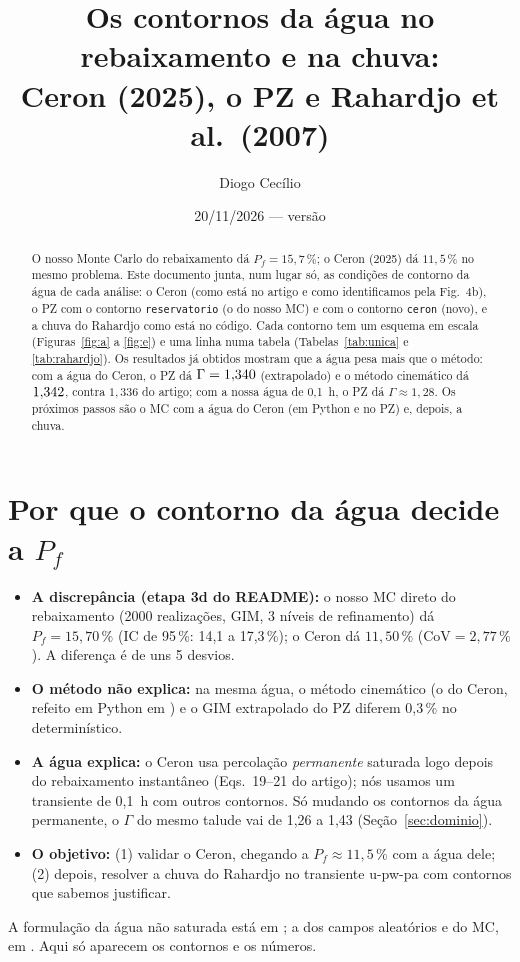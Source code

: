 \documentclass[11pt,a4paper]{article}
\title{Os contornos da água no rebaixamento e na chuva:\\ Ceron (2025), o PZ e Rahardjo et al.\ (2007)}
\author{Diogo Cecílio}
\date{20/11/2026 --- versão \versao}
\begin{document}
\maketitle
\begin{abstract}
O nosso Monte Carlo do rebaixamento dá $P_f = 15{,}7\,\%$; o Ceron (2025) dá $11{,}5\,\%$ no mesmo problema. Este
documento junta, num lugar só, as condições de contorno da água de cada análise: o Ceron (como está no artigo e como
identificamos pela Fig.~4b), o PZ com o contorno \texttt{reservatorio} (o do nosso MC) e com o contorno
\texttt{ceron} (novo), e a chuva do Rahardjo como está no código. Cada contorno tem um esquema em escala
(Figuras~\ref{fig:a} a \ref{fig:e}) e uma linha numa tabela (Tabelas~\ref{tab:unica} e \ref{tab:rahardjo}). Os
resultados já obtidos mostram que a água pesa mais que o método: com a água do Ceron, o PZ dá
$\Gamma = 1{,}340$ (extrapolado) e o método cinemático dá $1{,}342$, contra $1{,}336$ do artigo; com a nossa água de
0,1~h, o PZ dá $\Gamma \approx 1{,}28$. Os próximos passos são o MC com a água do Ceron (em Python e no PZ) e, depois,
a chuva.
\end{abstract}
\tableofcontents

\section{Por que o contorno da água decide a $P_f$}
\begin{itemize}
  \item \textbf{A discrepância (etapa 3d do README):} o nosso MC direto do rebaixamento (2000 realizações, GIM, 3 níveis
    de refinamento) dá $P_f = 15{,}70\,\%$ (IC de 95\,\%: 14,1 a 17,3\,\%); o Ceron dá $11{,}50\,\%$
    ($\mathrm{CoV} = 2{,}77\,\%$). A diferença é de uns 5 desvios.
  \item \textbf{O método não explica:} na mesma água, o método cinemático (o do Ceron, refeito em Python em
    ) e o GIM extrapolado do PZ diferem 0,3\,\% no determinístico.
  \item \textbf{A água explica:} o Ceron usa percolação \emph{permanente} saturada logo depois do rebaixamento
    instantâneo (Eqs.~19--21 do artigo); nós usamos um transiente de 0,1~h com outros contornos. Só mudando os
    contornos da água permanente, o $\Gamma$ do mesmo talude vai de 1,26 a 1,43 (Seção~\ref{sec:dominio}).
  \item \textbf{O objetivo:} (1) validar o Ceron, chegando a $P_f \approx 11{,}5\,\%$ com a água dele; (2) depois,
    resolver a chuva do Rahardjo no transiente u-pw-pa com contornos que sabemos justificar.
\end{itemize}
A formulação da água não saturada está em ; a dos campos aleatórios e do MC, em
. Aqui só aparecem os contornos e os números.
\end{document}
